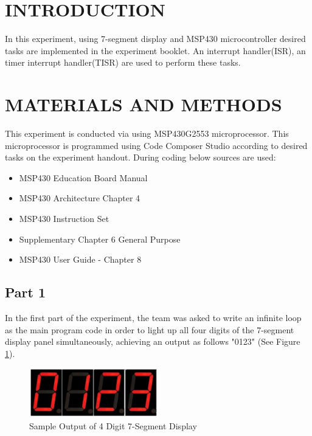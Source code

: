 \documentclass[pdftex,12pt,a4paper]{article}
\begin{document}
\section{INTRODUCTION}

In this experiment, using 7-segment display and MSP430 microcontroller desired tasks are implemented in the experiment booklet. An interrupt handler(ISR), an timer interrupt handler(TISR) are used to perform these tasks.
\section{MATERIALS AND METHODS}

This experiment is conducted via using MSP430G2553 microprocessor. This microprocessor is programmed using Code Composer Studio according to desired tasks on the experiment handout. During coding below sources are used:

\begin{itemize}
    \item MSP430 Education Board Manual \cite{ref2}
    \item MSP430 Architecture Chapter 4 \cite{ref3}
    \item MSP430 Instruction Set \cite{ref4}
    \item Supplementary Chapter 6 General Purpose \cite{ref5}
    \item MSP430 User Guide - Chapter 8 \cite{ref5}
\end{itemize}

\subsection{Part 1}

In the first part of the experiment, the team was asked to write an infinite loop as the main program code in order to light up all four digits of the 7-segment display panel simultaneously, achieving an output as follows "0123" (See Figure \ref{fig:output-sevensegment}). 

\begin{figure}[H]
    \centering
    \includegraphics[width=0.5\textwidth]{0123_7segment.png}
    \caption{Sample Output of 4 Digit 7-Segment Display}
    \label{fig:output-sevensegment}
\end{figure}
\end{document}
